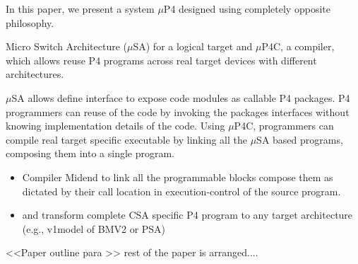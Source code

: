 In this paper, we present a system $\mu$P4 designed using completely opposite philosophy.


Micro Switch Architecture ($\mu$SA) for a logical target and $\mu$P4C, a compiler, which allows reuse P4 programs across real target devices with different architectures.



$\mu$SA allows define interface to expose code modules as callable P4 packages.
P4 programmers can reuse of the code by invoking the packages interfaces without knowing implementation details of the code.
Using $\mu$P4C, programmers can compile real target specific executable by linking all the $\mu$SA based programs, composing them into a single program.
\begin{itemize}
 \item Compiler Midend to link all the programmable blocks compose them as dictated by their call location in execution-control of the source program.
 \item and transform complete CSA specific P4 program to any target architecture (e.g., v1model of BMV2 or PSA)
\end{itemize}

%  
% 
%  
%  
%  

<<Paper outline para  >> rest of the paper is arranged....

